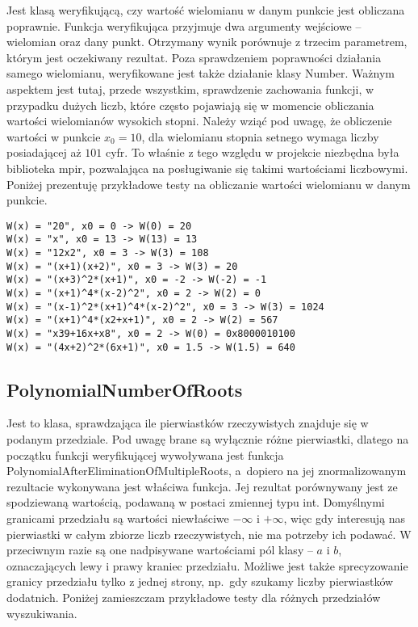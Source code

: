 Jest klasą weryfikującą, czy wartość wielomianu w danym punkcie jest obliczana poprawnie. Funkcja weryfikująca przyjmuje dwa argumenty wejściowe – wielomian oraz dany punkt. Otrzymany wynik porównuje z trzecim parametrem, którym jest oczekiwany rezultat. Poza sprawdzeniem poprawności działania samego wielomianu, weryfikowane jest także działanie klasy Number. Ważnym aspektem jest tutaj, przede wszystkim, sprawdzenie zachowania funkcji, w przypadku dużych liczb, które często pojawiają się w momencie obliczania wartości wielomianów wysokich stopni. Należy wziąć pod uwagę, że obliczenie wartości w punkcie $x_0=10$, dla wielomianu stopnia setnego wymaga liczby posiadającej aż $101$ cyfr. To właśnie z tego względu w projekcie niezbędna była biblioteka mpir, pozwalająca na posługiwanie się takimi wartościami liczbowymi. Poniżej prezentuję przykładowe testy na obliczanie wartości wielomianu w danym punkcie.

\begin{lstlisting}
W(x) = "20", x0 = 0 -> W(0) = 20
W(x) = "x", x0 = 13 -> W(13) = 13
W(x) = "12x2", x0 = 3 -> W(3) = 108
W(x) = "(x+1)(x+2)", x0 = 3 -> W(3) = 20
W(x) = "(x+3)^2*(x+1)", x0 = -2 -> W(-2) = -1
W(x) = "(x+1)^4*(x-2)^2", x0 = 2 -> W(2) = 0
W(x) = "(x-1)^2*(x+1)^4*(x-2)^2", x0 = 3 -> W(3) = 1024
W(x) = "(x+1)^4*(x2+x+1)", x0 = 2 -> W(2) = 567
W(x) = "x39+16x+x8", x0 = 2 -> W(0) = 0x8000010100
W(x) = "(4x+2)^2*(6x+1)", x0 = 1.5 -> W(1.5) = 640
\end{lstlisting}

\subsection{PolynomialNumberOfRoots}

Jest to klasa, sprawdzająca ile pierwiastków rzeczywistych znajduje się w podanym przedziale. Pod uwagę brane są wyłącznie różne pierwiastki, dlatego na początku funkcji weryfikującej wywoływana jest funkcja PolynomialAfterEliminationOfMultipleRoots, a~dopiero na jej znormalizowanym rezultacie wykonywana jest właściwa funkcja. Jej rezultat porównywany jest ze spodziewaną wartością, podawaną w postaci zmiennej typu int. Domyślnymi granicami przedziału są wartości niewłaściwe $-\infty$ i $+\infty$, więc gdy interesują nas pierwiastki w całym zbiorze liczb rzeczywistych, nie ma potrzeby ich podawać. W przeciwnym razie są one nadpisywane wartościami pól klasy – $a$ i $b$, oznaczających lewy i prawy kraniec przedziału. Możliwe jest także sprecyzowanie granicy przedziału tylko z jednej strony, np.\ gdy szukamy liczby pierwiastków dodatnich. Poniżej zamieszczam przykładowe testy dla różnych przedziałów wyszukiwania.

